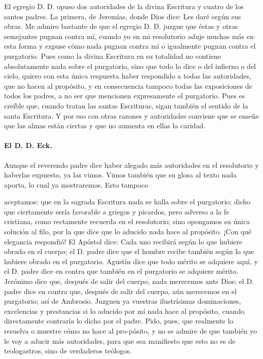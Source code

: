 El egregio D. D. opuso dos autoridades de la divina Escritura y cuatro de los santos padres. La primera, de Jeremías, donde Dios dice: Les daré según sus obras. Me admiro bastante de que el egregio D. D. juzgue que éstas y otras semejantes pugnan contra mí, cuando yo en mi resolutorio aduje muchas más en esta forma y expuse cómo nada pugnan contra mí o igualmente pugnan contra el purgatorio. Pues como la divina Escritura en su totalidad no contiene absolutamente nada sobre el purgatorio, sino que todo lo dice o del infierno o del cielo, quiero con esta única respuesta haber respondido a todas las autoridades, que no hacen al propósito, y en consecuencia tampoco todas las exposiciones de todos los padres, a no ser que mencionen expresamente el purgatorio. Pues es creíble que, cuando tratan las santas Escrituras, sigan también el sentido de la santa Escritura. Y por eso con otras razones y autoridades conviene que se enseñe que las almas están ciertas y que no aumenta en ellas la caridad.

\paragraph*{El D. D. Eck.}

Aunque el reverendo padre dice haber alegado más autoridades en el resolutorio y haberlas expuesto, ya las vimos. Vimos también que su glosa al texto nada aporta, lo cual ya mostraremos. Esto tampoco

aceptamos: que en la sagrada Escritura nada se halla sobre el purgatorio; dicho que ciertamente sería favorable a griegos y picardos, pero adverso a la fe cristiana, como rectamente recuerda en el resolutorio; sino opongamos su única solución al filo, por la que dice que lo aducido nada hace al propósito. ¡Con qué elegancia respondió! El Apóstol dice: Cada uno recibirá según lo que hubiere obrado en el cuerpo; el D. padre dice que el hombre recibe también según lo que hubiere obrado en el purgatorio. Agustín dice que todo mérito se adquiere aquí, y el D. padre dice en contra que también en el purgatorio se adquiere mérito. Jerónimo dice que, después de salir del cuerpo, nada merecemos ante Dios; el D. padre dice en contra que, después de salir del cuerpo, aún merecemos en el purgatorio; así de Ambrosio. Juzguen ya vuestras ilustrísimas dominaciones, excelencias y prestancias si lo aducido por mí nada hace al propósito, cuando directamente contraría lo dicho por el padre. Pido, pues, que realmente lo resuelva o muestre cómo no hace al pro-\marginpar{\small[324]}pósito, y no se admire de que también yo le voy a aducir más autoridades, para que sea manifiesto que esto no es de teologastros, sino de verdaderos teólogos.

